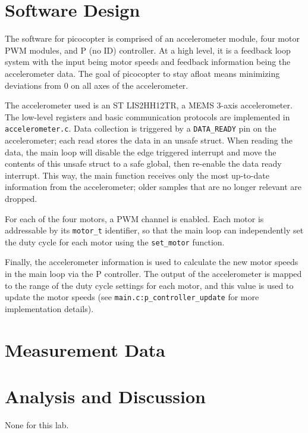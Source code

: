 \documentclass{article}
\begin{document}
\section{Software Design}

The software for picocopter is comprised of an accelerometer module, four motor
PWM modules, and P (no ID) controller. At a high level, it is a feedback loop
system with the input being motor speeds and feedback information being the
accelerometer data. The goal of picocopter to stay afloat means minimizing
deviations from 0 on all axes of the accelerometer.

The accelerometer used is an ST LIS2HH12TR, a MEMS 3-axis accelerometer. The
low-level registers and basic communication protocols are implemented in
\texttt{accelerometer.c}. Data collection is triggered by a \texttt{DATA\_READY}
pin on the accelerometer; each read stores the data in an unsafe struct. When
reading the data, the main loop will disable the edge triggered interrupt and
move the contents of this unsafe struct to a safe global, then re-enable
the data ready interrupt. This way, the main function receives only the most
up-to-date information from the accelerometer; older samples that are no longer
relevant are dropped.

For each of the four motors, a PWM channel is enabled. Each motor is
addressable by its \texttt{motor\_t} identifier, so that the main loop can
independently set the duty cycle for each motor using the \texttt{set\_motor}
function.

Finally, the accelerometer information is used to calculate the new motor
speeds in the main loop via the P controller. The output of the accelerometer
is mapped to the range of the duty cycle settings for each motor, and this
value is used to update the motor speeds (see
\texttt{main.c:p\_controller\_update} for more implementation details).


\section{Measurement Data}

\section{Analysis and Discussion}
None for this lab.
\end{document}
